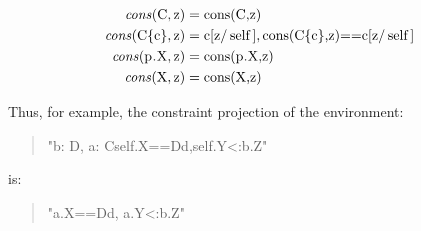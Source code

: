 \documentclass[preprint,nocopyrightspace,9pt]{sigplanconf}
\begin{document}
\begin{align*}
\cons{\Xcd{C}}{\Xcd{z}} &=
    \Xcd{cons(C,z)} \\
\cons{\Xcd{C\{c\}}}{\Xcd{z}} &=
    \Xcd{c}[\Xcd{z}/\Xcd{self}], \Xcd{cons(C\{c\},z)==c}[\Xcd{z}/\Xcd{self}] \\
\cons{\Xcd{p.X}}{\Xcd{z}} &=
    \Xcd{cons(p.X,z)} \\
\cons{\Xcd{X}}{\Xcd{z}} &=
    \Xcd{cons(X,z)} \\
\end{align*}

\noindent
Thus, for example, the constraint projection of the environment:
\begin{quote}
\xcdmath"b: D, a: C{self.X==D{d},self.Y<:b.Z}"
\end{quote}
\noindent is:
\begin{quote}
\xcdmath"a.X==D{d}, a.Y<:b.Z" \\
\end{quote}
\end{document}
